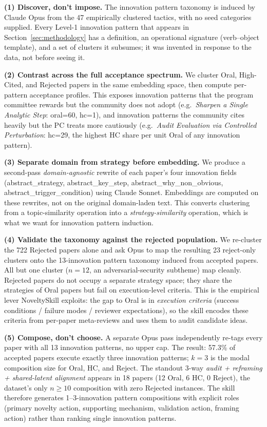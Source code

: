 \documentclass[10pt,a4paper]{article}
\begin{document}
\textbf{(1) Discover, don't impose.} The innovation pattern taxonomy is induced by Claude Opus from the 47 empirically clustered tactics, with no seed categories supplied. Every Level-1 innovation pattern that appears in Section~\ref{sec:methodology} has a definition, an operational signature (verb--object template), and a set of clusters it subsumes; it was invented in response to the data, not before seeing it.

\textbf{(2) Contrast across the full acceptance spectrum.} We cluster Oral, High-Cited, and Rejected papers in the same embedding space, then compute per-pattern acceptance profiles. This exposes innovation patterns that the program committee rewards but the community does not adopt (e.g.\ \emph{Sharpen a Single Analytic Step}: oral=60, hc=1), and innovation patterns the community cites heavily but the PC treats more cautiously (e.g.\ \emph{Audit Evaluation via Controlled Perturbation}: hc=29, the highest HC share per unit Oral of any innovation pattern).

\textbf{(3) Separate domain from strategy before embedding.} We produce a second-pass \emph{domain-agnostic} rewrite of each paper's four innovation fields (abstract\_strategy, abstract\_key\_step, abstract\_why\_non\_obvious, abstract\_trigger\_condition) using Claude Sonnet. Embeddings are computed on these rewrites, not on the original domain-laden text. This converts clustering from a topic-similarity operation into a \emph{strategy-similarity} operation, which is what we want for innovation pattern induction.

\textbf{(4) Validate the taxonomy against the rejected population.} We re-cluster the 722 Rejected papers alone and ask Opus to map the resulting 23 reject-only clusters onto the 13-innovation pattern taxonomy induced from accepted papers. All but one cluster (\(n{=}12\), an adversarial-security subtheme) map cleanly. Rejected papers do not occupy a separate strategy space; they share the strategies of Oral papers but fail on execution-level criteria. This is the empirical lever NoveltySkill exploits: the gap to Oral is in \emph{execution criteria} (success conditions / failure modes / reviewer expectations), so the skill encodes these criteria from per-paper meta-reviews and uses them to audit candidate ideas.

\textbf{(5) Compose, don't choose.} A separate Opus pass independently re-tags every paper with all 13 innovation patterns, no upper cap. The result: 57.3\% of accepted papers execute exactly three innovation patterns; \(k{=}3\) is the modal composition size for Oral, HC, and Reject. The standout 3-way \emph{audit + reframing + shared-latent alignment} appears in 18 papers (12 Oral, 6 HC, 0 Reject), the dataset's only \(n{\geq}10\) composition with zero Rejected instances. The skill therefore generates 1--3-innovation pattern compositions with explicit roles (primary novelty action, supporting mechanism, validation action, framing action) rather than ranking single innovation patterns.
\end{document}
